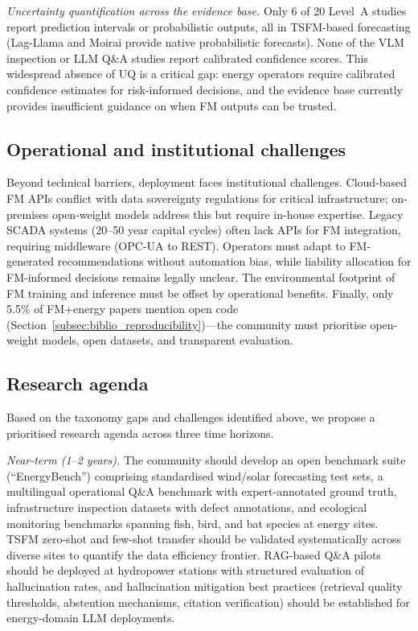 \documentclass[preprint,12pt]{elsarticle}
\begin{document}
\textit{Uncertainty quantification across the evidence base.} Only 6 of 20 Level~A studies report prediction intervals or probabilistic outputs, all in TSFM-based forecasting (Lag-Llama \cite{rasul2023lagllama} and Moirai \cite{woo2024moirai} provide native probabilistic forecasts). None of the VLM inspection or LLM Q\&A studies report calibrated confidence scores. This widespread absence of UQ is a critical gap: energy operators require calibrated confidence estimates for risk-informed decisions, and the evidence base currently provides insufficient guidance on when FM outputs can be trusted.

\subsection{Operational and institutional challenges}
\label{subsec:operational_challenges}

Beyond technical barriers, deployment faces institutional challenges. Cloud-based FM APIs conflict with data sovereignty regulations for critical infrastructure; on-premises open-weight models address this but require in-house expertise. Legacy SCADA systems (20--50 year capital cycles) often lack APIs for FM integration, requiring middleware (OPC-UA to REST). Operators must adapt to FM-generated recommendations without automation bias, while liability allocation for FM-informed decisions remains legally unclear. The environmental footprint of FM training and inference must be offset by operational benefits. Finally, only 5.5\% of FM+energy papers mention open code (Section~\ref{subsec:biblio_reproducibility})---the community must prioritise open-weight models, open datasets, and transparent evaluation.

\subsection{Research agenda}
\label{subsec:research_agenda}

Based on the taxonomy gaps and challenges identified above, we propose a prioritised research agenda across three time horizons.

\textit{Near-term (1--2 years).} The community should develop an open benchmark suite (``EnergyBench'') comprising standardised wind/solar forecasting test sets, a multilingual operational Q\&A benchmark with expert-annotated ground truth, infrastructure inspection datasets with defect annotations, and ecological monitoring benchmarks spanning fish, bird, and bat species at energy sites. TSFM zero-shot and few-shot transfer should be validated systematically across diverse sites to quantify the data efficiency frontier. RAG-based Q\&A pilots should be deployed at hydropower stations with structured evaluation of hallucination rates, and hallucination mitigation best practices (retrieval quality thresholds, abstention mechanisms, citation verification) should be established for energy-domain LLM deployments.
\end{document}

